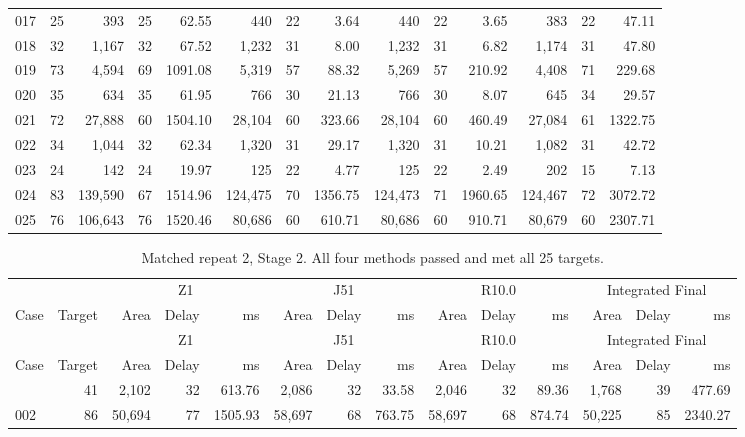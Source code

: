 {\begin{longtable}{@{}lr*{4}{rrr}@{}}
017 & 25 & 393 & 25 & 62.55 & 440 & 22 & 3.64 & 440 & 22 & 3.65 & 383 & 22 & 47.11 \\
018 & 32 & 1,167 & 32 & 67.52 & 1,232 & 31 & 8.00 & 1,232 & 31 & 6.82 & 1,174 & 31 & 47.80 \\
019 & 73 & 4,594 & 69 & 1091.08 & 5,319 & 57 & 88.32 & 5,269 & 57 & 210.92 & 4,408 & 71 & 229.68 \\
020 & 35 & 634 & 35 & 61.95 & 766 & 30 & 21.13 & 766 & 30 & 8.07 & 645 & 34 & 29.57 \\
021 & 72 & 27,888 & 60 & 1504.10 & 28,104 & 60 & 323.66 & 28,104 & 60 & 460.49 & 27,084 & 61 & 1322.75 \\
022 & 34 & 1,044 & 32 & 62.34 & 1,320 & 31 & 29.17 & 1,320 & 31 & 10.21 & 1,082 & 31 & 42.72 \\
023 & 24 & 142 & 24 & 19.97 & 125 & 22 & 4.77 & 125 & 22 & 2.49 & 202 & 15 & 7.13 \\
024 & 83 & 139,590 & 67 & 1514.96 & 124,475 & 70 & 1356.75 & 124,473 & 71 & 1960.65 & 124,467 & 72 & 3072.72 \\
025 & 76 & 106,643 & 76 & 1520.46 & 80,686 & 60 & 610.71 & 80,686 & 60 & 910.71 & 80,679 & 60 & 2307.71 \\
\end{longtable}
\begin{longtable}{@{}lr*{4}{rrr}@{}}
\caption{Matched repeat 2, Stage 2. All four methods passed and met all 25 targets.}\\
\toprule
 & & \multicolumn{3}{c}{Z1} & \multicolumn{3}{c}{J51} & \multicolumn{3}{c}{R10.0} & \multicolumn{3}{c}{Integrated Final} \\
\cmidrule(lr){3-5}\cmidrule(lr){6-8}\cmidrule(lr){9-11}\cmidrule(lr){12-14}
Case & Target & Area & Delay & ms & Area & Delay & ms & Area & Delay & ms & Area & Delay & ms \\
\midrule
\endfirsthead
\toprule
 & & \multicolumn{3}{c}{Z1} & \multicolumn{3}{c}{J51} & \multicolumn{3}{c}{R10.0} & \multicolumn{3}{c}{Integrated Final} \\
\cmidrule(lr){3-5}\cmidrule(lr){6-8}\cmidrule(lr){9-11}\cmidrule(lr){12-14}
Case & Target & Area & Delay & ms & Area & Delay & ms & Area & Delay & ms & Area & Delay & ms \\
\midrule
\endhead
\bottomrule
\endlastfoot
001 & 41 & 2,102 & 32 & 613.76 & 2,086 & 32 & 33.58 & 2,046 & 32 & 89.36 & 1,768 & 39 & 477.69 \\
002 & 86 & 50,694 & 77 & 1505.93 & 58,697 & 68 & 763.75 & 58,697 & 68 & 874.74 & 50,225 & 85 & 2340.27 \\

\end{longtable}}
